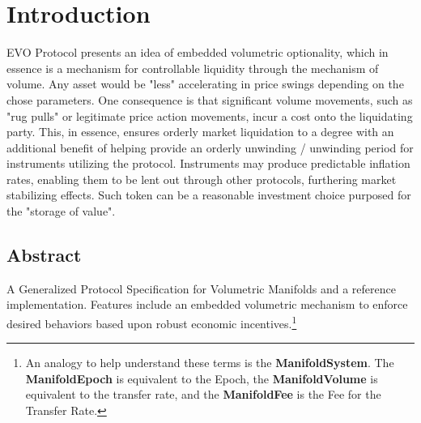 



\chapter{Introduction}\label{sec:introduction}

EVO Protocol presents an idea of embedded volumetric optionality, which in essence is a mechanism for controllable
liquidity through the mechanism of volume. Any 
asset would be "less" accelerating in price swings depending on the chose parameters. One consequence is that
significant volume movements, such as "rug pulls" or 
legitimate price action movements, incur a cost onto the liquidating party. This, in essence, ensures orderly market
liquidation to a degree with an additional 
benefit of helping provide an orderly unwinding / unwinding period for instruments utilizing the protocol. Instruments
may produce predictable inflation rates, 
enabling them to be lent out through other protocols, furthering market stabilizing effects. Such token can be a
reasonable investment choice purposed for the 
"storage of value".

\section{Abstract}\label{sec:preamble}
A Generalized Protocol Specification for Volumetric Manifolds and a reference implementation. Features include an
embedded 
volumetric mechanism to enforce desired behaviors
based upon robust economic incentives.\footnote{An analogy to help understand these terms is the
\textbf{ManifoldSystem}. The \textbf{ManifoldEpoch} is equivalent to the Epoch,
the \textbf{ManifoldVolume} is equivalent to the
transfer rate, and the \textbf{ManifoldFee} is the
Fee for the Transfer Rate.}

